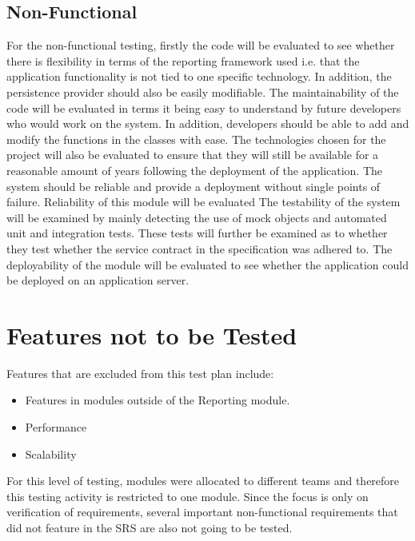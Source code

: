 \subsection{Non-Functional}
\begin{enumerate}
\list For the non-functional testing, firstly the code will be evaluated to see whether there is flexibility in terms of the reporting framework used i.e. that the application functionality is not tied to one specific technology. In addition, the persistence provider should also be easily modifiable. 
\list The maintainability of the code will be evaluated in terms it being easy to understand by future developers who would work on the system. In addition, developers should be able to add and modify the functions in the classes with ease. The technologies chosen for the project will also be evaluated to ensure that they will still be available for a reasonable amount of years following the deployment of the application.
\list The system should be reliable and provide a deployment without single points of failure. Reliability of this module will be evaluated 
\list The testability of the system will be examined by mainly detecting the use of mock objects and automated unit and integration tests. These tests will further be examined as to whether they test whether the service contract in the specification was adhered to.
\list The deployability of the module will be evaluated to see whether the application could be deployed on an application server.
\section{Features not to be Tested}
Features that are excluded from this test plan include:
\begin{itemize}
	\item Features in modules outside of the Reporting module.
	\item Performance
	\item Scalability
\end{itemize}

For this level of testing, modules were allocated to different teams and therefore this testing activity is restricted to one module. Since the focus is only on verification of requirements, several important non-functional requirements that did not feature in the SRS are also not going to be tested.


\end{enumerate}
